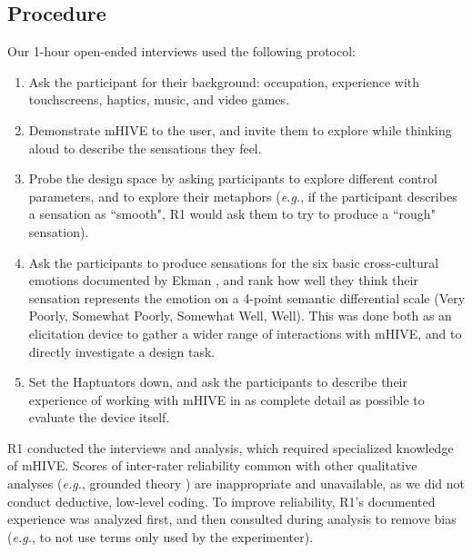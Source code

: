 \subsection{Procedure}
Our 1-hour open-ended interviews
used the following protocol:
\begin{enumerate}
	\item Ask the participant for their background: occupation, experience with touchscreens, haptics, music, and video games.
	\item Demonstrate mHIVE to the user, and invite them to explore while thinking aloud to describe the sensations they feel.
	\item Probe the design space by asking participants to explore different control parameters, and to explore their metaphors (\emph{e.g.}, if the participant describes a sensation as ``smooth", R1 would ask them to try to produce a ``rough" sensation).
	\item Ask the participants to produce sensations for the six basic cross-cultural emotions documented by Ekman \cite{Ekman1992}, and rank how well they think their sensation represents the emotion on a 4-point semantic differential scale (Very Poorly, Somewhat Poorly, Somewhat Well, Well). This was done both as an elicitation device to gather a wider range of interactions with mHIVE, and to directly investigate a design task.
	\item Set the Haptuators down, and ask the participants to describe their experience of working with mHIVE in as complete detail as possible to evaluate the device itself.
\end{enumerate}

\noindent
R1 conducted the interviews and analysis, which required specialized knowledge of mHIVE.
Scores of inter-rater reliability common with other qualitative analyses (\emph{e.g.}, grounded theory \cite{Corbin2008}) are inappropriate and unavailable, as we did not conduct deductive, low-level coding.
To improve reliability,  R1's documented experience was analyzed first, and then consulted during analysis to remove bias (\emph{e.g.}, to not use terms only used by the experimenter).

